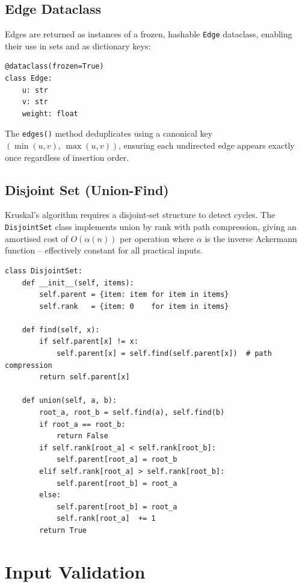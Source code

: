 \documentclass[12pt, a4paper]{article}
\begin{document}
\subsection{Edge Dataclass}

Edges are returned as instances of a frozen, hashable \texttt{Edge}
dataclass, enabling their use in sets and as dictionary keys:

\begin{lstlisting}[caption={Edge dataclass (\texttt{src/core/graph.py}).}]
@dataclass(frozen=True)
class Edge:
    u: str
    v: str
    weight: float
\end{lstlisting}

The \texttt{edges()} method deduplicates using a canonical key
$(\min(u,v),\, \max(u,v))$, ensuring each undirected edge appears exactly
once regardless of insertion order.

\subsection{Disjoint Set (Union-Find)}

Kruskal's algorithm requires a disjoint-set structure to detect cycles.
The \texttt{DisjointSet} class implements union by rank with path
compression, giving an amortised cost of $O(\alpha(n))$ per operation
where $\alpha$ is the inverse Ackermann function -- effectively constant
for all practical inputs.

\begin{lstlisting}[caption={Disjoint-Set (\texttt{src/algorithms/kruskal.py}).}]
class DisjointSet:
    def __init__(self, items):
        self.parent = {item: item for item in items}
        self.rank   = {item: 0    for item in items}

    def find(self, x):
        if self.parent[x] != x:
            self.parent[x] = self.find(self.parent[x])  # path compression
        return self.parent[x]

    def union(self, a, b):
        root_a, root_b = self.find(a), self.find(b)
        if root_a == root_b:
            return False
        if self.rank[root_a] < self.rank[root_b]:
            self.parent[root_a] = root_b
        elif self.rank[root_a] > self.rank[root_b]:
            self.parent[root_b] = root_a
        else:
            self.parent[root_b] = root_a
            self.rank[root_a]  += 1
        return True
\end{lstlisting}

\section{Input Validation}
\label{sec:validation}
\end{document}
